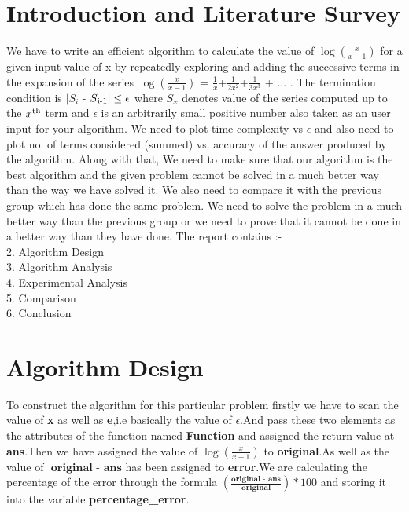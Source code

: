 \documentclass[conference]{IEEEtran}
\begin{document}
\section{\textbf{Introduction and Literature Survey}}
We have to write an efficient algorithm to calculate the value of \textbf{$\log{\left(\frac{x}{x-1}\right)}$} for a given input value of x by repeatedly exploring and adding the successive terms in the expansion of the series $\log{\left(\frac{x}{x-1}\right)}$ = $\frac{1}{x}$+$\frac{1}{2x^2}$+$\frac{1}{3x^3}$ + ... . The termination condition is $|S_{i}$ - $ S\textsubscript{i-1}| \leq \epsilon $ where $S_x$ denotes value of the series computed up to the $ x\textsuperscript{th}$ term and $\epsilon$ is an arbitrarily small positive number also taken as an user input for your algorithm. We need to plot time complexity vs $\epsilon$ and also need to plot no. of terms considered (summed) vs. accuracy of the answer produced by the algorithm.
Along with that, We need to make sure that our algorithm is the best algorithm and the given problem cannot be solved in a much better way than the way we have solved it. We also need to compare it with the previous group which has done the same problem. We need to solve the problem in a much better way than the previous group or we need to prove that it cannot be done in a better way than they have done.
The report contains :-\\
2. Algorithm Design\\
3. Algorithm Analysis\\
4. Experimental Analysis\\
5. Comparison\\
6. Conclusion\\

\section{\textbf{Algorithm Design}}
To construct the algorithm for this particular problem firstly we have to scan the value of \textbf{x} as well as \textbf{e},i.e basically the value of \textbf{$\epsilon$}.And pass these two elements as the attributes of the function named \textbf{Function} and assigned the return value at \textbf{ans}.Then we have assigned the value of $\log{\left(\frac{x}{x-1}\right)}$ to \textbf{original}.As well as the value of $\textbf{ original - ans}$ has been assigned to \textbf{error}.We are calculating the percentage of the error through the formula $\left(\frac{\textbf{original - ans}}{\textbf{original}}\right)*100$ and storing it into the variable \textbf{percentage\_error}.\\
\end{document}
